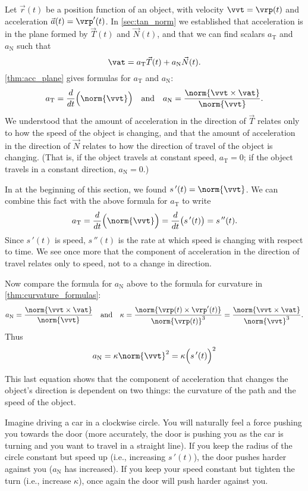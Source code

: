 Let $\vec r(t)$ be a position function of an object, with velocity $\vvt = \vrp(t)$ and acceleration $\vec a(t)=\vrp'(t)$. In \autoref{sec:tan_norm} we established that acceleration is in the plane formed by $\vec T(t)$ and $\vec N(t)$, and that we can find scalars $a_\text{T}$ and $a_\text{N}$ such that 
$$\vat = a_\text{T}\vec T(t) + a_\text{N}\vec N(t).$$ \autoref{thm:acc_plane} gives formulas for $a_\text{T}$ and $a_\text{N}$:
$$a_\text{T} = \frac{d}{dt}\Big(\norm{\vvt}\Big) \quad \text{and} \quad a_\text{N} = \frac{\norm{\vvt\times \vat}}{\norm{\vvt}}.$$
We understood that the amount of acceleration in the direction of $\vec T$ relates only to how the speed of the object is changing, and that the amount of acceleration in the direction of $\vec N$ relates to how the direction of travel of the object is changing. (That is, if the object travels at constant speed, $a_\text{T}=0$; if the object travels in a constant direction, $a_\text{N}=0$.)


In  at the beginning of this section, we found
$s\,'(t) = \norm{\vvt}$. We can combine this fact with the above formula for $a_\text{T}$ to write
$$a_\text{T} = \frac{d}{dt}\Big(\norm{\vvt}\Big) = \frac{d}{dt}\big( s\,'(t)\big) = s\,''(t).$$
Since $s\,'(t)$ is speed, $s\,''(t)$ is the rate at which speed is changing with respect to time. We see once more that the component of acceleration in the direction of travel relates only to speed, not to a change in direction.

Now compare the formula for $a_\text{N}$ above to the formula for curvature in \autoref{thm:curvature_formulas}:
$$a_\text{N} = \frac{\norm{\vvt\times \vat}}{\norm{\vvt}}\quad \text{and}\quad \kappa = \frac{\norm{\vrp(t)\times\vrp'(t)}}{\norm{\vrp(t)}^3}=\frac{\norm{\vvt\times \vat}}{\norm{\vvt}^3} .$$
Thus 
\begin{equation}\label{eq:curvature_an}
a_\text{N} = \kappa \norm{\vvt}^2 = \kappa\Big(s\,'(t)\Big)^2
\end{equation}

This last equation shows that the component of acceleration that changes the object's direction is dependent on two things: the curvature of the path and the speed of the object.

Imagine driving a car in a clockwise circle. You will naturally feel a force pushing you towards the door (more accurately, the door is pushing you as the car is turning and you want to travel in a straight line). If you keep the radius of the circle constant but speed up (i.e., increasing $s\,'(t)$), the door pushes harder against you ($a_\text{N}$ has increased). If you keep your speed constant but tighten the turn (i.e., increase $\kappa$), once again the door will push harder against you.

